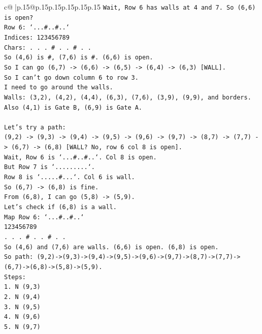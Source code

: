 \documentclass{article}
\begin{document}
{\begin{supertabular}{c@{$\;$}|p{.15\linewidth}@{}p{.15\linewidth}p{.15\linewidth}p{.15\linewidth}p{.15\linewidth}p{.15\linewidth}}
{{{\texttt{Wait, Row 6 has walls at 4 and 7. So (6,6) is open?} \\
\texttt{Row 6: `...\#..\#..`} \\
\texttt{Indices: 123456789} \\
\texttt{Chars: . . . \# . . \# . .} \\
\texttt{So (4,6) is \#, (7,6) is \#. (6,6) is open.} \\
\texttt{So I can go (6,7) {-}> (6,6) {-}> (6,5) {-}> (6,4) {-}> (6,3) {[}WALL{]}.} \\
\texttt{So I can't go down column 6 to row 3.} \\
\texttt{I need to go around the walls.} \\
\texttt{Walls: (3,2), (4,2), (4,4), (6,3), (7,6), (3,9), (9,9), and borders.} \\
\texttt{Also (4,1) is Gate B, (6,9) is Gate A.} \\
\\ 
\texttt{Let's try a path:} \\
\texttt{(9,2) {-}> (9,3) {-}> (9,4) {-}> (9,5) {-}> (9,6) {-}> (9,7) {-}> (8,7) {-}> (7,7) {-}> (6,7) {-}> (6,8) {[}WALL? No, row 6 col 8 is open{]}.} \\
\texttt{Wait, Row 6 is `...\#..\#..`. Col 8 is open.} \\
\texttt{But Row 7 is `.........`.} \\
\texttt{Row 8 is `.....\#...`. Col 6 is wall.} \\
\texttt{So (6,7) {-}> (6,8) is fine.} \\
\texttt{From (6,8), I can go (5,8) {-}> (5,9).} \\
\texttt{Let's check if (6,8) is a wall.} \\
\texttt{Map Row 6: `...\#..\#..`} \\
\texttt{123456789} \\
\texttt{. . . \# . . \# . .} \\
\texttt{So (4,6) and (7,6) are walls. (6,6) is open. (6,8) is open.} \\
\texttt{So path: (9,2){-}>(9,3){-}>(9,4){-}>(9,5){-}>(9,6){-}>(9,7){-}>(8,7){-}>(7,7){-}>(6,7){-}>(6,8){-}>(5,8){-}>(5,9).} \\
\texttt{Steps:} \\
\texttt{1. N (9,3)} \\
\texttt{2. N (9,4)} \\
\texttt{3. N (9,5)} \\
\texttt{4. N (9,6)} \\
\texttt{5. N (9,7)} \\
}}}
\end{supertabular}}
\end{document}
